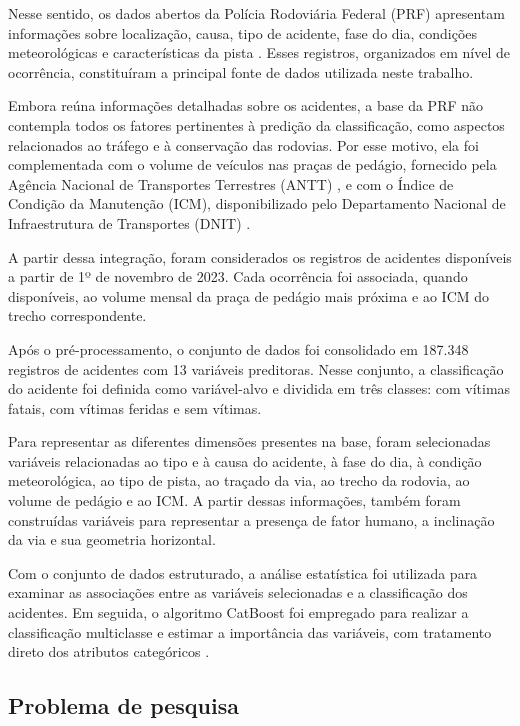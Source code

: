 \documentclass[12pt]{article}
\begin{document}
Nesse sentido, os dados abertos da Polícia Rodoviária Federal (PRF) apresentam informações sobre localização, causa, tipo de acidente, fase do dia, condições meteorológicas e características da pista \cite{prf_dados_abertos}. Esses registros, organizados em nível de ocorrência, constituíram a principal fonte de dados utilizada neste trabalho.

Embora reúna informações detalhadas sobre os acidentes, a base da PRF não contempla todos os fatores pertinentes à predição da classificação, como aspectos relacionados ao tráfego e à conservação das rodovias. Por esse motivo, ela foi complementada com o volume de veículos nas praças de pedágio, fornecido pela Agência Nacional de Transportes Terrestres (ANTT) \cite{antt_dados_abertos}, e com o Índice de Condição da Manutenção (ICM), disponibilizado pelo Departamento Nacional de Infraestrutura de Transportes (DNIT) \cite{dnit_icm}.

A partir dessa integração, foram considerados os registros de acidentes disponíveis a partir de 1º de novembro de 2023. Cada ocorrência foi associada, quando disponíveis, ao volume mensal da praça de pedágio mais próxima e ao ICM do trecho correspondente.

Após o pré-processamento, o conjunto de dados foi consolidado em 187.348 registros de acidentes com 13 variáveis preditoras. Nesse conjunto, a classificação do acidente foi definida como variável-alvo e dividida em três classes: com vítimas fatais, com vítimas feridas e sem vítimas.

Para representar as diferentes dimensões presentes na base, foram selecionadas variáveis relacionadas ao tipo e à causa do acidente, à fase do dia, à condição meteorológica, ao tipo de pista, ao traçado da via, ao trecho da rodovia, ao volume de pedágio e ao ICM. A partir dessas informações, também foram construídas variáveis para representar a presença de fator humano, a inclinação da via e sua geometria horizontal.

Com o conjunto de dados estruturado, a análise estatística foi utilizada para examinar as associações entre as variáveis selecionadas e a classificação dos acidentes. Em seguida, o algoritmo CatBoost foi empregado para realizar a classificação multiclasse e estimar a importância das variáveis, com tratamento direto dos atributos categóricos \cite{prokhorenkova2018catboost}.

\subsection{Problema de pesquisa}
\end{document}
